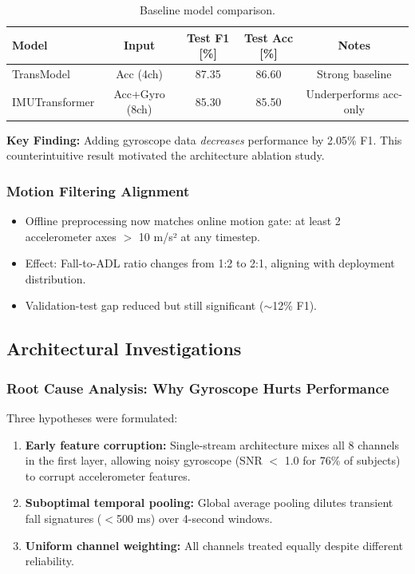 \begin{table}[h]
    \centering
    \caption{Baseline model comparison.}
    \label{tab:baseline_comparison}
    \begin{tabular}{lcccc}
        \toprule
        Model & Input & Test F1 [\%] & Test Acc [\%] & Notes \\
        \midrule
        TransModel & Acc (4ch) & 87.35 & 86.60 & Strong baseline \\
        IMUTransformer & Acc+Gyro (8ch) & 85.30 & 85.50 & Underperforms acc-only \\
        \bottomrule
    \end{tabular}
\end{table}

\textbf{Key Finding:} Adding gyroscope data \textit{decreases} performance by 2.05\% F1. This counterintuitive result motivated the architecture ablation study.

\subsubsection{Motion Filtering Alignment}

\begin{itemize}
    \item Offline preprocessing now matches online motion gate: at least 2 accelerometer axes $>$ 10 m/s² at any timestep.
    \item Effect: Fall-to-ADL ratio changes from 1:2 to 2:1, aligning with deployment distribution.
    \item Validation-test gap reduced but still significant ($\sim$12\% F1).
\end{itemize}

\subsection{Architectural Investigations}

\subsubsection{Root Cause Analysis: Why Gyroscope Hurts Performance}

Three hypotheses were formulated:
\begin{enumerate}
    \item \textbf{Early feature corruption:} Single-stream architecture mixes all 8 channels in the first layer, allowing noisy gyroscope (SNR $<$ 1.0 for 76\% of subjects) to corrupt accelerometer features.
    \item \textbf{Suboptimal temporal pooling:} Global average pooling dilutes transient fall signatures ($<$500 ms) over 4-second windows.
    \item \textbf{Uniform channel weighting:} All channels treated equally despite different reliability.
\end{enumerate}

